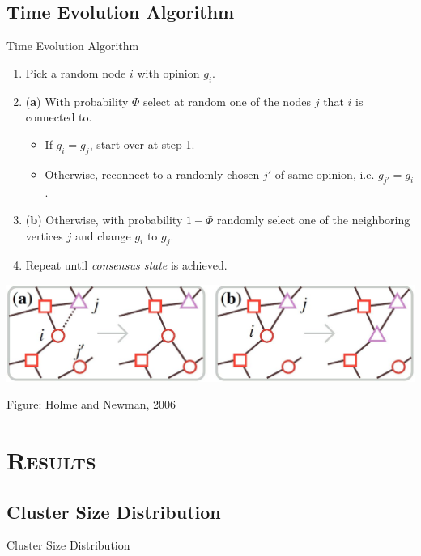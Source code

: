 \documentclass[xcolor=x11names,compress]{beamer}
\renewcommand{\(}{\begin{columns}}
\renewcommand{\)}{\end{columns}}
\newcommand{\<}[1]{\begin{column}{#1}}
\renewcommand{\>}{\end{column}}
\begin{document}
\subsection{Time Evolution Algorithm}
\begin{frame}{Time Evolution Algorithm}
\begin{enumerate}
\item Pick a random node $i$ with opinion $g_i$.  
\item (\textbf{a}) With probability $\Phi$ select at random one of the nodes $j$ that $i$ is connected to.
\begin{itemize}
\item If $g_i = g_j$, start over at step 1.
\item Otherwise, reconnect to a randomly chosen $j'$ of same opinion, i.e. $g_{j'} = g_i$.
\end{itemize}
\item (\textbf{b}) Otherwise, with probability $1-\Phi$ randomly select one of the neighboring vertices $j$ and change $g_i$ to $g_j$.
\item Repeat until \emph{consensus state} is achieved.
\end{enumerate}
\begin{center}
\includegraphics[scale=0.25]{Graphics/ModelIllustration.jpg}
\end{center}

\begin{tiny}
Figure: Holme and Newman, 2006 \cite{main paper}
\end{tiny}

\end{frame}

\section{\scshape Results}

\subsection{Cluster Size Distribution}
\begin{frame}{Cluster Size Distribution}
\end{frame}
\end{document}
